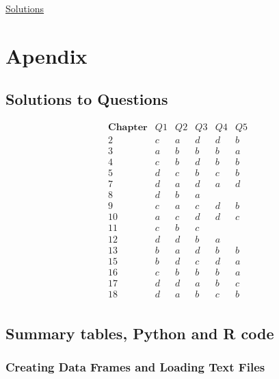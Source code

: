 \documentclass[
]{book}
\begin{document}
\href{https://colab.research.google.com/drive/14i2h9AYxHh4KIfxBB9Px7VwnYdSFVBq5?usp=sharing}{Solutions}

\hypertarget{apendix}{%
\chapter{Apendix}\label{apendix}}

\hypertarget{solutions-to-questions}{%
\section{Solutions to Questions}\label{solutions-to-questions}}

\[
\begin{array}{c|ccccc}
\textbf{Chapter} & Q1 & Q2 & Q3 & Q4 & Q5 \\ \hline
2  & c & a & d & d & b \\
3  & a & b & b & b & a \\
4  & c & b & d & b & b \\
5  & d & c & b & c & b \\
7  & d & a & d & a & d \\
8  & d & b & a &   &   \\
9  & c & a & c & d & b \\
10 & a & c & d & d & c \\
11 & c & b & c &   &   \\
12 & d & d & b & a &   \\
13 & b & a & d & b & b \\
15 & b & d & c & d & a \\
16 & c & b & b & b & a \\
17 & d & d & a & b & c \\
18 & d & a & b & c & b \\
\end{array}
\]

\hypertarget{summary-tables-python-and-r-code}{%
\section{Summary tables, Python and R code}\label{summary-tables-python-and-r-code}}

\hypertarget{creating-data-frames-and-loading-text-files}{%
\subsection{Creating Data Frames and Loading Text Files}\label{creating-data-frames-and-loading-text-files}}
\end{document}
